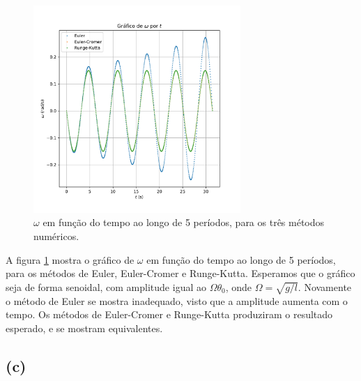 \documentclass[a4paper, brazil]{article}
\begin{document}
\begin{figure}[ht]
\centering
\includegraphics[width=0.7\textwidth]{fig1b.pdf}
\caption{\( \omega \) em função do tempo ao longo de 5 períodos, para os três métodos numéricos.}
\label{fig1b}
\end{figure}

A figura \ref{fig1b} mostra o gráfico de \( \omega \) em função do tempo ao longo de 5 períodos, para os métodos de Euler, Euler-Cromer e Runge-Kutta.
Esperamos que o gráfico seja de forma senoidal, com amplitude igual ao \( \Omega \theta_0 \), onde \( \Omega = \sqrt{g / l} \).
Novamente o método de Euler se mostra inadequado, visto que a amplitude aumenta com o tempo.
Os métodos de Euler-Cromer e Runge-Kutta produziram o resultado esperado, e se mostram equivalentes.

\newpage
\subsection{(c)}
\end{document}
